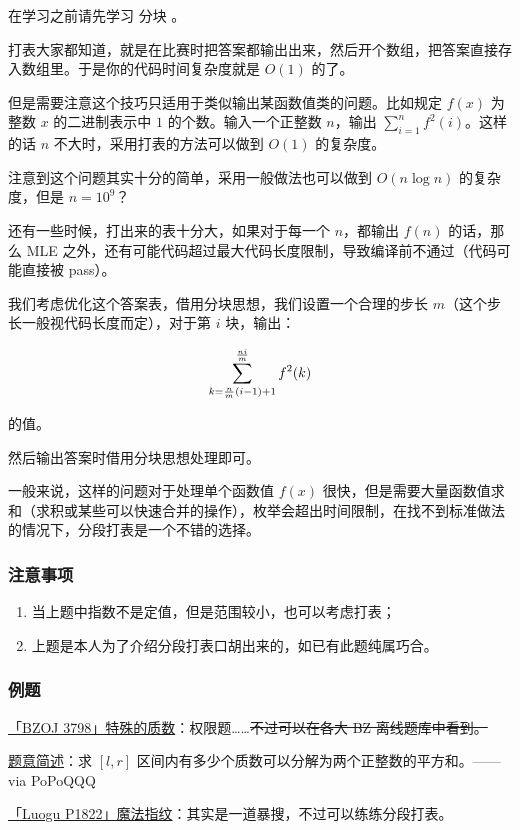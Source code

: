 
在学习之前请先学习  分块 。

打表大家都知道，就是在比赛时把答案都输出出来，然后开个数组，把答案直接存入数组里。于是你的代码时间复杂度就是 $O(1)$ 的了。

但是需要注意这个技巧只适用于类似输出某函数值类的问题。比如规定 $f(x)$ 为整数 $x$ 的二进制表示中 $1$ 的个数。输入一个正整数 $n$，输出 $\sum_{i=1}^nf^2(i)$。这样的话 $n$ 不大时，采用打表的方法可以做到 $O(1)$ 的复杂度。

注意到这个问题其实十分的简单，采用一般做法也可以做到 $O(n\log n)$ 的复杂度，但是 $n=10^9$？

还有一些时候，打出来的表十分大，如果对于每一个 $n$，都输出 $f(n)$ 的话，那么 MLE 之外，还有可能代码超过最大代码长度限制，导致编译前不通过（代码可能直接被 pass）。

我们考虑优化这个答案表，借用分块思想，我们设置一个合理的步长 $m$（这个步长一般视代码长度而定），对于第 $i$ 块，输出：

$$
\Large \sum_{k=\frac{n}{m}(i-1)+1}^{\frac{ni}{m}} f^2(k)
$$

的值。

然后输出答案时借用分块思想处理即可。

一般来说，这样的问题对于处理单个函数值 $f(x)$ 很快，但是需要大量函数值求和（求积或某些可以快速合并的操作），枚举会超出时间限制，在找不到标准做法的情况下，分段打表是一个不错的选择。

\subsubsection{注意事项}

\begin{enumerate}
\item 当上题中指数不是定值，但是范围较小，也可以考虑打表；
\item 上题是本人为了介绍分段打表口胡出来的，如已有此题纯属巧合。
\end{enumerate}

\subsubsection{例题}

\href{https://www.lydsy.com/JudgeOnline/problem.php?id=3798}{「BZOJ 3798」特殊的质数}：权限题……\sout{不过可以在各大 BZ 离线题库中看到。}

\href{https://www.zhihu.com/question/60674478/answer/180805562}{题意简述}：求 $[l,r]$ 区间内有多少个质数可以分解为两个正整数的平方和。—— via PoPoQQQ

\href{https://www.luogu.org/problem/show?pid=P1822}{「Luogu P1822」魔法指纹}：其实是一道暴搜，不过可以练练分段打表。

